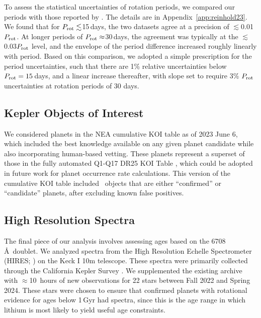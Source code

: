 \documentclass[11pt,twocolumn,tighten,linenumbers,trackchanges]{aastex63}
\begin{document}
To assess the statistical uncertainties of  rotation periods, we
compared our  periods with those reported by
\citet{McQuillan_2014}.  The details are in
Appendix~\ref{app:reinhold23}.  We found that for $P_{\rm
rot}\lesssim$15\,days, the two datasets agree at a precision of
$\lesssim$0.01$P_{\rm rot}$.  At longer periods of $P_{\rm
rot}\approx$30\,days, the agreement was typically at the
$\lesssim$0.03$P_{\rm rot}$ level, and the envelope of the period
difference increased roughly linearly with period.  Based on this
comparison, we adopted a simple prescription for the period
uncertainties, such that there are 1\% relative uncertainties below
$P_{\rm rot}=15$\,days, and a linear increase thereafter, with slope
set to require 3\% $P_{\rm rot}$ uncertainties at rotation periods of
30 days.







\subsection{Kepler Objects of Interest}
\label{subsec:planetsel}

We considered planets in the NEA cumulative KOI table as of 2023 June
6, which included the best knowledge available on any given planet
candidate while also incorporating human-based vetting.  These planets
represent a superset of those in the fully automated Q1-Q17 DR25 KOI
Table \citep{Thompson_2018}, which could be adopted in future work for
planet occurrence rate calculations.  This version of the cumulative
KOI table included \nkoisnofp\ objects that are either ``confirmed''
or ``candidate'' planets, after excluding known false positives. 

\subsection{High Resolution Spectra}
\label{subsec:lithiumsel}

The final piece of our analysis involves assessing ages based on the
 6708\,\AA\ doublet.  We analyzed spectra from the High
Resolution Echelle Spectrometer (HIRES; \citealt{vogt_hires_1994}) on
the Keck I 10m telescope.  These spectra were primarily collected
through the California Kepler Survey
\citep{2017AJ....154..107P,2017AJ....154..108J,2017AJ....154..109F}.
We supplemented the existing archive with $\approx$10~hours of new
observations for 22 stars between Fall 2022 and Spring 2024.  These
stars were chosen to ensure that confirmed planets with rotational
evidence for ages below 1\,Gyr had spectra, since this is the age
range in which lithium is most likely to yield useful age constraints.
\end{document}
